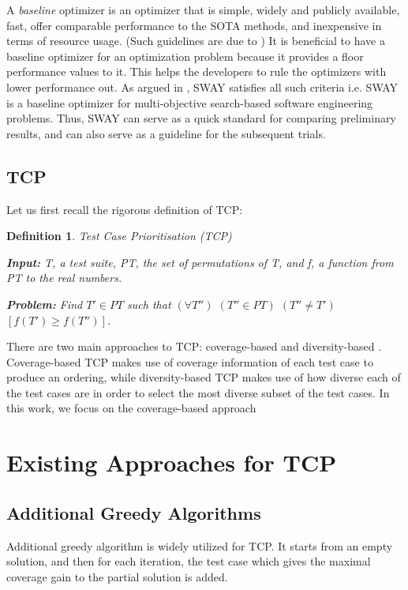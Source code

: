 \documentclass[10pt,journal,compsoc]{IEEEtran}
\newtheorem{definition}{Definition}[section]
\begin{document}
	A {\it baseline} optimizer is an optimizer that is simple, widely and publicly available, fast, offer comparable performance to the SOTA methods, and inexpensive in terms of resource usage.
	(Such guidelines are due to \cite{WOM15})
	It is beneficial to have a baseline optimizer for an optimization problem because it provides a floor performance values to it. This helps the developers to rule the optimizers with lower performance out. 
	As argued in \cite{SWAY}, SWAY satisfies all such criteria i.e. SWAY is a baseline optimizer for multi-objective search-based software engineering problems. Thus, SWAY can serve as a quick standard for comparing preliminary results, and can also serve as a guideline for the subsequent trials.
	
	
	\subsection{TCP}
	Let us first recall the rigorous definition of TCP\cite{RYCC01}:
	\begin{definition}
		Test Case Prioritisation (TCP)
		
		{\bf Input:} T, a test suite, PT, the set of permutations of T, and f, a function from PT to the real numbers.
		
		{\bf Problem:} Find $T' \in PT$ such that $(\forall T'')$ $(T'' \in PT)$ $(T'' \neq T')$ $[f(T') \geq f(T'')]$.
	\end{definition}
	
	There are two main approaches to TCP: coverage-based and diversity-based \cite{MHD15}. Coverage-based TCP makes use of coverage information of each test case to produce an ordering, while diversity-based TCP makes use of how diverse each of the test cases are in order to select the most diverse subset of the test cases.
	In this work, we focus on the coverage-based approach
	
	
	\section{Existing Approaches for TCP}
	\label{sec:existing}
	
	\subsection{Additional Greedy Algorithms}
	Additional greedy algorithm is widely utilized for TCP. It starts from an empty solution, and then for each iteration, the test case which gives the maximal coverage gain to the partial solution is added. 
	
\end{document}
